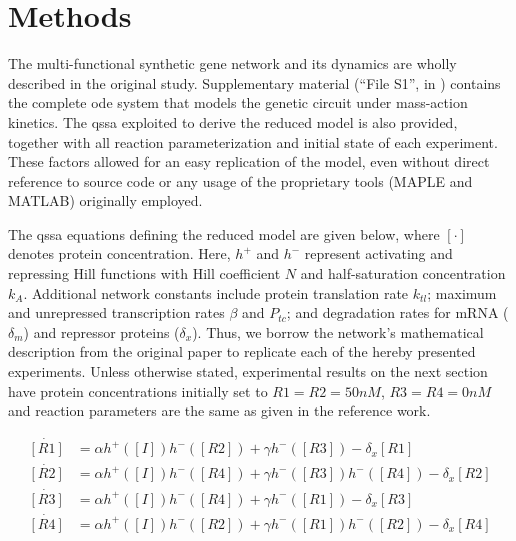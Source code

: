 \section{Methods}

  The multi-functional synthetic gene network and its dynamics are wholly described in the original study.
  Supplementary material (``File S1'', in \cite{multif}) contains the complete \ac{ode} system that models the genetic circuit under mass-action kinetics.
  The \ac{qssa} exploited to derive the reduced model is also provided, together with all reaction parameterization and initial state of each experiment.
  These factors allowed for an easy replication of the model, even without direct reference to source code or any usage of the proprietary tools (MAPLE and MATLAB) originally employed.

  The \ac{qssa} equations defining the reduced model are given below, where $[\cdot]$ denotes protein concentration.
  Here, $h^+$ and $h^-$ represent activating and repressing Hill functions with Hill coefficient $N$ and half-saturation concentration $k_A$.
  Additional network constants include protein translation rate $k_{tl}$; maximum and unrepressed transcription rates $\beta$ and $P_{tc}$; and degradation rates for mRNA ($\delta_m$) and repressor proteins ($\delta_x$).
  Thus, we borrow the network's mathematical description from the original paper to replicate each of the hereby presented experiments.
  Unless otherwise stated, experimental results on the next section have protein concentrations initially set to $R1 = R2 = 50nM$, $R3 = R4 = 0nM$ and reaction parameters are the same as given in the reference work.

  \begin{equation*}\label{eq:qssa}
    \begin{aligned}
      \dot{[R1]} &= \alpha h^+([I]) h^-([R2]) + \gamma h^-([R3])           - \delta_x [R1] \\
      \dot{[R2]} &= \alpha h^+([I]) h^-([R4]) + \gamma h^-([R3]) h^-([R4]) - \delta_x [R2] \\
      \dot{[R3]} &= \alpha h^+([I]) h^-([R4]) + \gamma h^-([R1])           - \delta_x [R3] \\
      \dot{[R4]} &= \alpha h^+([I]) h^-([R2]) + \gamma h^-([R1]) h^-([R2]) - \delta_x [R4] \\
    \end{aligned}
  \end{equation*}

